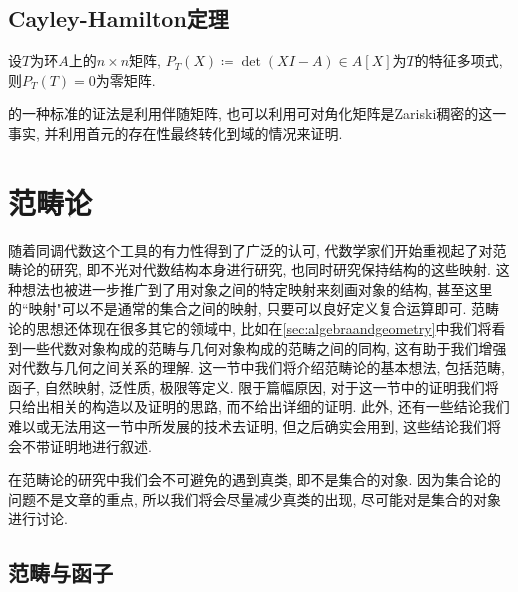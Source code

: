 \subsection{Cayley-Hamilton定理}

\begin{theoremnoproof}\label{thm:CayleyHamilton}
  设$T$为环$A$上的$n\times n$矩阵, $P_T(X)\coloneq \det (XI-A)\in A[X]$为$T$的特征多项式, 则$P_T(T)=0$为零矩阵.
\end{theoremnoproof}

的一种标准的证法是利用伴随矩阵, 也可以利用可对角化矩阵是Zariski稠密的这一事实, 并利用首元的存在性最终转化到域的情况来证明.

\section{范畴论}\label{sec:algebra-category}

随着同调代数这个工具的有力性得到了广泛的认可, 代数学家们开始重视起了对范畴论的研究, 即不光对代数结构本身进行研究, 也同时研究保持结构的这些映射. 这种想法也被进一步推广到了用对象之间的特定映射来刻画对象的结构, 甚至这里的``映射"可以不是通常的集合之间的映射, 只要可以良好定义复合运算即可. 范畴论的思想还体现在很多其它的领域中, 比如在\ref{sec:algebraandgeometry}中我们将看到一些代数对象构成的范畴与几何对象构成的范畴之间的同构, 这有助于我们增强对代数与几何之间关系的理解. 这一节中我们将介绍范畴论的基本想法, 包括范畴, 函子, 自然映射, 泛性质, 极限等定义. 限于篇幅原因, 对于这一节中的证明我们将只给出相关的构造以及证明的思路, 而不给出详细的证明. 此外, 还有一些结论我们难以或无法用这一节中所发展的技术去证明, 但之后确实会用到, 这些结论我们将会不带证明地进行叙述.

在范畴论的研究中我们会不可避免的遇到真类, 即不是集合的对象. 因为集合论的问题不是文章的重点, 所以我们将会尽量减少真类的出现, 尽可能对是集合的对象进行讨论.

\subsection{范畴与函子}

